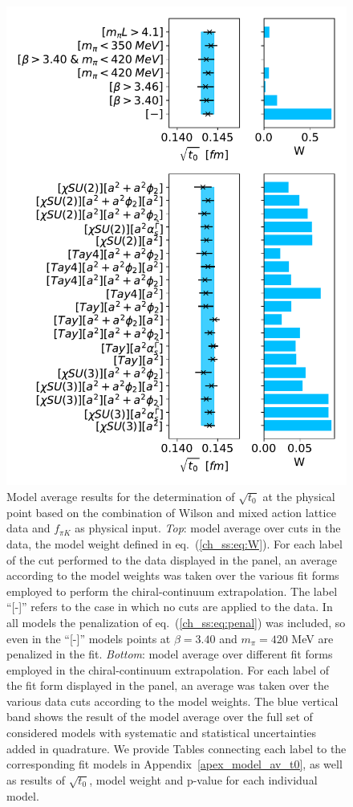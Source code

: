 \begin{figure}
    \centering
    \includegraphics[width=1.\textwidth]{./cap5/figs/BMA_comb_subav_c=1_cphi=0.0035.pdf}
    \caption{Model average results for the determination of $\sqrt{t_0}$ at the physical point based on the combination of Wilson and mixed action lattice data and $f_{\pi K}$ as physical input. \textit{Top}: model average over cuts in the data, the model weight defined in eq.~(\ref{ch_ss:eq:W}). For each label of the cut performed to the data displayed in the panel, an average according to the model weights was taken over the various fit forms employed to perform the chiral-continuum extrapolation. The label ``[-]'' refers to the case in which no cuts are applied to the data. In all models the penalization of eq.~(\ref{ch_ss:eq:penal}) was included, so even in the ``[-]'' models points at $\beta=3.40$ and $m_{\pi}=420$ MeV are penalized in the fit. \textit{Bottom}: model average over different fit forms employed in  the chiral-continuum extrapolation. For each label of the fit form displayed in the panel, an average was taken over the various data cuts according to the model weights. The blue vertical band shows the result of the model average over the full set of considered models with systematic and statistical uncertainties added in quadrature. We provide Tables connecting each label to the corresponding fit models in Appendix~\ref{apex_model_av_t0}, as well as results of $\sqrt{t_0}$, model weight and p-value for each individual model.}
    \label{ch_ss:fig:BMA_comb}
\end{figure}

